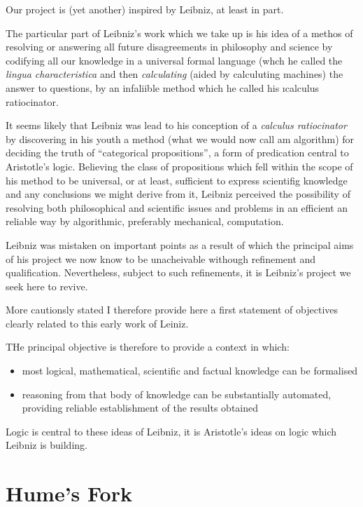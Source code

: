 Our project is (yet another) inspired by Leibniz, at least in part.

The particular part of Leibniz's work which we take up is his idea of a methos of resolving or answering all future disagreements in philosophy and science by codifying all our knowledge in a universal formal language (whch he called the {\it lingua characteristica} and then {\it calculating} (aided by calculuting machines) the answer to questions, by an infaliible method which he called his {\i calculus ratiocinator}.

It seems likely that Leibniz was lead to his conception of a {\it calculus ratiocinator} by discovering in his youth a method (what we would now call am algorithm) for deciding the truth of ``categorical propositions'', a form of predication central to Aristotle's logic.
Believing the class of propositions which fell within the scope of his method to be universal, or at least, sufficient to express scientifig knowledge and any conclusions we might derive from it, Leibniz perceived the possibility of resolving both philosophical and scientific issues and problems in an efficient an reliable way by algorithmic, preferably mechanical, computation.

Leibniz was mistaken on important points as a result of which the principal aims of his project we now know to be unacheivable withough refinement and qualification.
Nevertheless, subject to such refinements, it is Leibniz's project we seek here to revive.

More cautionsly stated I therefore provide here a first statement of objectives clearly related to this early work of Leiniz.

THe principal objective is therefore to provide a context in which:

\begin{itemize}
\item most logical, mathematical, scientific and factual knowledge can be formalised
\item reasoning from that body of knowledge can be substantially automated, providing reliable establishment of the results obtained
\end{itemize}

Logic is central to these ideas of Leibniz, it is Aristotle's ideas on logic which Leibniz is building.
 


\section{Hume's Fork}

